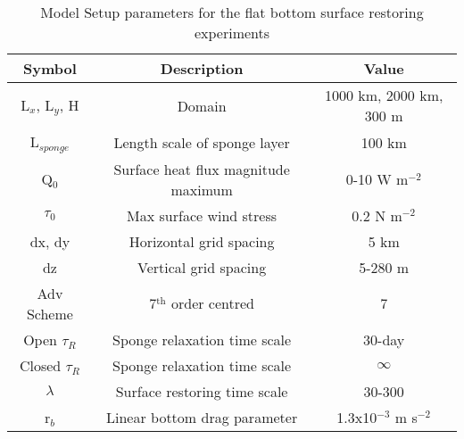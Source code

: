 \begin{table}
\caption{Model Setup parameters for the flat bottom surface restoring experiments}
\label{tab:setup2}
\begin{center}
\begin{tabular}{|c|c|c|}
\hline \hline
\textbf{Symbol} & \textbf{Description}  & \textbf{Value} \\ 
\hline 
L$_x$, L$_y$, H & Domain & 1000 km, 2000 km, 300 m \\ 
\hline 
L$_{sponge}$ & Length scale of sponge layer & 100 km \\ 
\hline 
Q$_0$ & Surface heat flux magnitude maximum & 0-10 W m$^{-2}$ \\ 
\hline 
$\tau _0$ & Max surface wind stress & 0.2 N m$^{-2}$ \\ 
\hline 
dx, dy & Horizontal grid spacing & 5 km  \\ 
\hline 
dz & Vertical grid spacing & 5-280 m \\ 
\hline 
Adv Scheme & 7$^{\text{th}}$ order centred & 7 \\ 
\hline 
Open $\tau_{R}$ & Sponge relaxation time scale & 30-day  \\ 
\hline 
Closed $\tau_{R}$ & Sponge relaxation time scale &  $\infty$ \\ 
\hline 
$\lambda$ & Surface restoring time scale &  30-300 \\ 
\hline 
r$_b $& Linear bottom drag parameter & 1.3x10$^{-3}$ m s$^{-2}$ \\ 
\hline 
\end{tabular}
\end{center}
\end{table}

